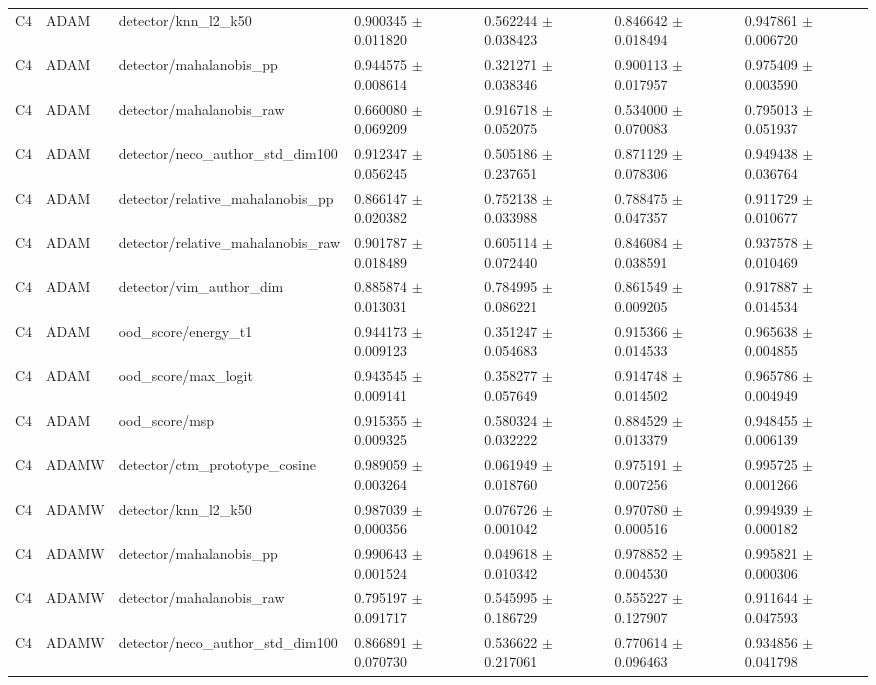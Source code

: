 \begin{longtable}{lllllll}
C4 & ADAM & detector/knn\_l2\_k50 & 0.900345 $\pm$ 0.011820 & 0.562244 $\pm$ 0.038423 & 0.846642 $\pm$ 0.018494 & 0.947861 $\pm$ 0.006720 \\
C4 & ADAM & detector/mahalanobis\_pp & 0.944575 $\pm$ 0.008614 & 0.321271 $\pm$ 0.038346 & 0.900113 $\pm$ 0.017957 & 0.975409 $\pm$ 0.003590 \\
C4 & ADAM & detector/mahalanobis\_raw & 0.660080 $\pm$ 0.069209 & 0.916718 $\pm$ 0.052075 & 0.534000 $\pm$ 0.070083 & 0.795013 $\pm$ 0.051937 \\
C4 & ADAM & detector/neco\_author\_std\_dim100 & 0.912347 $\pm$ 0.056245 & 0.505186 $\pm$ 0.237651 & 0.871129 $\pm$ 0.078306 & 0.949438 $\pm$ 0.036764 \\
C4 & ADAM & detector/relative\_mahalanobis\_pp & 0.866147 $\pm$ 0.020382 & 0.752138 $\pm$ 0.033988 & 0.788475 $\pm$ 0.047357 & 0.911729 $\pm$ 0.010677 \\
C4 & ADAM & detector/relative\_mahalanobis\_raw & 0.901787 $\pm$ 0.018489 & 0.605114 $\pm$ 0.072440 & 0.846084 $\pm$ 0.038591 & 0.937578 $\pm$ 0.010469 \\
C4 & ADAM & detector/vim\_author\_dim & 0.885874 $\pm$ 0.013031 & 0.784995 $\pm$ 0.086221 & 0.861549 $\pm$ 0.009205 & 0.917887 $\pm$ 0.014534 \\
C4 & ADAM & ood\_score/energy\_t1 & 0.944173 $\pm$ 0.009123 & 0.351247 $\pm$ 0.054683 & 0.915366 $\pm$ 0.014533 & 0.965638 $\pm$ 0.004855 \\
C4 & ADAM & ood\_score/max\_logit & 0.943545 $\pm$ 0.009141 & 0.358277 $\pm$ 0.057649 & 0.914748 $\pm$ 0.014502 & 0.965786 $\pm$ 0.004949 \\
C4 & ADAM & ood\_score/msp & 0.915355 $\pm$ 0.009325 & 0.580324 $\pm$ 0.032222 & 0.884529 $\pm$ 0.013379 & 0.948455 $\pm$ 0.006139 \\
C4 & ADAMW & detector/ctm\_prototype\_cosine & 0.989059 $\pm$ 0.003264 & 0.061949 $\pm$ 0.018760 & 0.975191 $\pm$ 0.007256 & 0.995725 $\pm$ 0.001266 \\
C4 & ADAMW & detector/knn\_l2\_k50 & 0.987039 $\pm$ 0.000356 & 0.076726 $\pm$ 0.001042 & 0.970780 $\pm$ 0.000516 & 0.994939 $\pm$ 0.000182 \\
C4 & ADAMW & detector/mahalanobis\_pp & 0.990643 $\pm$ 0.001524 & 0.049618 $\pm$ 0.010342 & 0.978852 $\pm$ 0.004530 & 0.995821 $\pm$ 0.000306 \\
C4 & ADAMW & detector/mahalanobis\_raw & 0.795197 $\pm$ 0.091717 & 0.545995 $\pm$ 0.186729 & 0.555227 $\pm$ 0.127907 & 0.911644 $\pm$ 0.047593 \\
C4 & ADAMW & detector/neco\_author\_std\_dim100 & 0.866891 $\pm$ 0.070730 & 0.536622 $\pm$ 0.217061 & 0.770614 $\pm$ 0.096463 & 0.934856 $\pm$ 0.041798 \\

\end{longtable}
